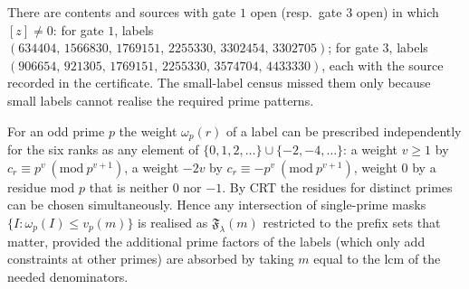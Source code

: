 \begin{proposition}\label{prop:gate-nec}
There are contents and sources with gate $1$ open (resp.\ gate $3$ open) in which $[z]\ne0$: for gate $1$, labels $(634404,\,1566830,\,1769151,\,2255330,\,3302454,\,3302705)$; for gate $3$, labels $(906654,\,921305,\,1769151,\,2255330,\,3574704,\,4433330)$, each with the source recorded in the certificate. The small-label census missed them only because small labels cannot realise the required prime patterns.
\end{proposition}
\begin{proposition}\label{prop:CRT}
For an odd prime $p$ the weight $\omega_p(r)$ of a label can be prescribed independently for the six ranks as any element of $\{0,1,2,\dots\}\cup\{-2,-4,\dots\}$: a weight $v\ge1$ by $c_r\equiv p^v\ (\mathrm{mod}\ p^{v+1})$, a weight $-2v$ by $c_r\equiv-p^v\ (\mathrm{mod}\ p^{v+1})$, weight $0$ by a residue mod $p$ that is neither $0$ nor $-1$. By CRT the residues for distinct primes can be chosen simultaneously. Hence any intersection of single-prime masks $\{I:\omega_p(I)\le v_p(m)\}$ is realised as $\mathfrak F_\lambda(m)$ restricted to the prefix sets that matter, provided the additional prime factors of the labels (which only add constraints at other primes) are absorbed by taking $m$ equal to the lcm of the needed denominators.
\end{proposition}

